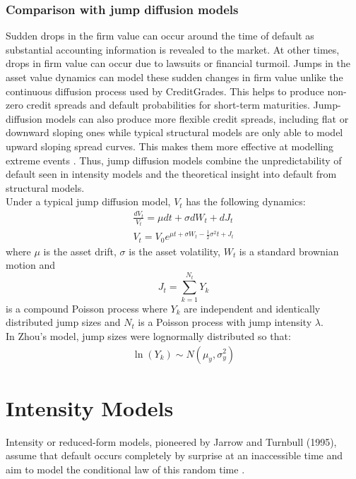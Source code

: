 \documentclass[11t,a4paper]{article}
\begin{document}
\subsubsection {Comparison with jump diffusion models}
Sudden drops in the firm value can occur around the time of default as substantial accounting information is revealed to the market. At other times, drops in firm value can occur due to lawsuits or financial turmoil. Jumps in the asset value dynamics can model these sudden changes in firm value unlike the continuous diffusion process used by CreditGrades. This helps to produce non-zero credit spreads and default probabilities for short-term maturities. Jump-diffusion models can also produce more flexible credit spreads, including flat or downward sloping ones while typical structural models are only able to model upward sloping spread curves. This makes them more effective at modelling extreme events \cite{zhou}. Thus, jump diffusion models combine the unpredictability of default seen in intensity models and the theoretical insight into default from structural models.\\
Under a typical jump diffusion model, $V_t$ has the following dynamics:
\begin{gather}
    \frac{dV_t}{V_t} = \mu dt + \sigma dW_t + dJ_t \\
    V_t = V_0 e^{\mu t + \sigma W_t - \frac{1}{2}\sigma^2t + J_t} 
\end{gather}
where $\mu$ is the asset drift, $\sigma$ is the asset volatility, $W_t$ is a standard brownian motion and \[J_t = \sum_{k=1}^{N_t}Y_k\]
is a compound Poisson process where $Y_k$ are independent and identically distributed jump sizes and $N_t$ is a Poisson process with jump intensity $\lambda$. \\
In Zhou's model, jump sizes were lognormally distributed so that:
\begin{align}
\ln(Y_k) \sim N(\mu_y, \sigma^2_y)
\end{align}

\section{Intensity Models}
Intensity or reduced-form models, pioneered by Jarrow and Turnbull (1995), assume that default occurs completely by surprise at an inaccessible time and aim to model the conditional law of this random time \cite{rf}. 
\end{document}
